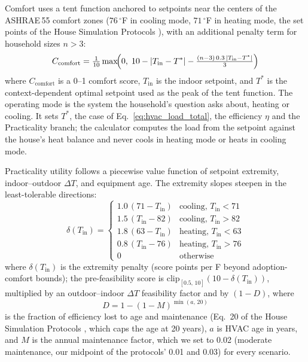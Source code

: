\documentclass[final,3p,times]{elsarticle}
\begin{document}
Comfort uses a tent function anchored to setpoints near the centers of the ASHRAE\,55 comfort zones \cite{ashrae55_2020} ($76\,^\circ$F in cooling mode, $71\,^\circ$F in heating mode, the set points of the House Simulation Protocols \cite{hendron2010hsp}), with an additional penalty term for household sizes $n > 3$:
\begin{equation}
  C_{\mathrm{comfort}} = \tfrac{1}{10}\max\!\Bigl(0,\; 10 - \lvert T_{\mathrm{in}} - T^{*}\rvert - \tfrac{(n-3)\,0.3\,\lvert T_{\mathrm{in}} - T^{*}\rvert}{3}\Bigr)
  \label{eq:hvac_comfort}
\end{equation}
\noindent where $C_{\mathrm{comfort}}$ is a 0--1 comfort score, $T_{\mathrm{in}}$ is the indoor setpoint, and $T^{*}$ is the context-dependent optimal setpoint used as the peak of the tent function. The operating mode is the system the household's question asks about, heating or cooling. It sets $T^{*}$, the case of Eq.~\ref{eq:hvac_load_total}, the efficiency $\eta$ and the Practicality branch; the calculator computes the load from the setpoint against the house's heat balance and never cools in heating mode or heats in cooling mode.

Practicality utility follows a piecewise value function of setpoint extremity, indoor--outdoor $\Delta T$, and equipment age. The extremity slopes steepen in the least-tolerable directions:
\begin{equation}
  \delta(T_{\mathrm{in}}) =
  \begin{cases}
    1.0\,(71 - T_{\mathrm{in}}) & \text{cooling, } T_{\mathrm{in}} < 71 \\[3pt]
    1.5\,(T_{\mathrm{in}} - 82) & \text{cooling, } T_{\mathrm{in}} > 82 \\[3pt]
    1.8\,(63 - T_{\mathrm{in}}) & \text{heating, } T_{\mathrm{in}} < 63 \\[3pt]
    0.8\,(T_{\mathrm{in}} - 76) & \text{heating, } T_{\mathrm{in}} > 76 \\[3pt]
    0                             & \text{otherwise}
  \end{cases}
  \label{eq:hvac_practicality}
\end{equation}
\noindent where $\delta(T_{\mathrm{in}})$ is the extremity penalty (score points per \textdegree{}F beyond adoption-comfort bounds); the pre-feasibility score is $\mathrm{clip}_{[0.5,\,10]}(10-\delta(T_{\mathrm{in}}))$, multiplied by an outdoor--indoor $\Delta T$ feasibility factor and by $(1-D)$, where
\begin{equation}
  D = 1 - (1 - M)^{\min(a,\,20)}
  \label{eq:hvac_degradation}
\end{equation}
\noindent is the fraction of efficiency lost to age and maintenance (Eq.~20 of the House Simulation Protocols \cite{hendron2010hsp}, which caps the age at 20 years), $a$ is HVAC age in years, and $M$ is the annual maintenance factor, which we set to 0.02 (moderate maintenance, our midpoint of the protocols' 0.01 and 0.03) for every scenario.
\end{document}

